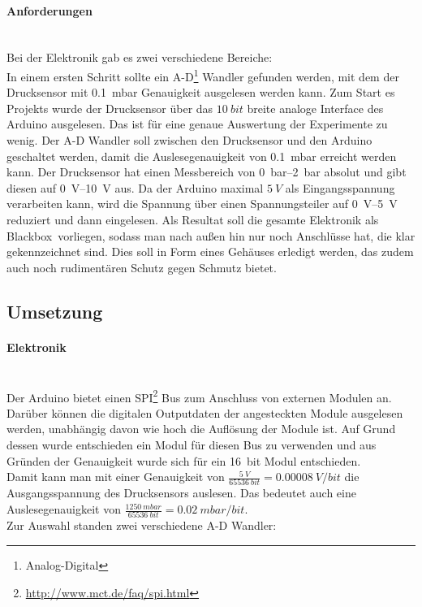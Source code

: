 \paragraph{Anforderungen}
\hfill \\
Bei der Elektronik gab es zwei verschiedene Bereiche: \\
In einem ersten Schritt sollte ein A-D\footnote{Analog-Digital} Wandler gefunden werden, mit dem der Drucksensor mit \SI{0,1}{mbar} Genauigkeit ausgelesen werden kann. Zum Start es Projekts wurde der Drucksensor über das $\SI{10}{bit}$ breite analoge Interface des Arduino ausgelesen. Das ist für eine genaue Auswertung der Experimente zu wenig. Der A-D Wandler soll zwischen den Drucksensor und den Arduino geschaltet werden, damit die Auslesegenauigkeit von \SI{0,1}{mbar} erreicht werden kann. Der Drucksensor hat einen Messbereich von \SIrange{0}{2}{\bar} absolut und gibt diesen auf \SIrange{0}{10}{\volt} aus. Da der Arduino maximal $\SI{5}{V}$ als Eingangsspannung verarbeiten kann, wird die Spannung über einen Spannungsteiler auf \SIrange{0}{5}{\volt} reduziert und dann eingelesen. 
Als Resultat soll die gesamte Elektronik als \glqq Blackbox\grqq \ vorliegen, sodass man nach außen hin nur noch Anschlüsse hat, die klar gekennzeichnet sind. Dies soll in Form eines Gehäuses erledigt werden, das zudem auch noch rudimentären Schutz gegen Schmutz bietet.


\subsection{Umsetzung}


\paragraph{Elektronik}
\hfill \\
Der Arduino bietet einen SPI\footnote{\url{http://www.mct.de/faq/spi.html}} Bus zum Anschluss von externen Modulen an. Darüber können die digitalen Outputdaten der angesteckten Module ausgelesen werden, unabhängig davon wie hoch die Auflösung der Module ist. Auf Grund dessen wurde entschieden ein Modul für diesen Bus zu verwenden und aus Gründen der Genauigkeit wurde sich für ein \SI{16}{bit} Modul entschieden. \\
Damit kann man mit einer Genauigkeit von $\frac{\SI{5}{V}}{\SI{65536}{bit}} = \SI{0,00008}{V/bit}$ die Ausgangsspannung des Drucksensors auslesen. Das bedeutet auch eine Auslesegenauigkeit von $\frac{\SI{1250}{mbar}}{\SI{65536}{bit}} = \SI{0,02}{mbar/bit}$. \\
Zur Auswahl standen zwei verschiedene A-D Wandler:

